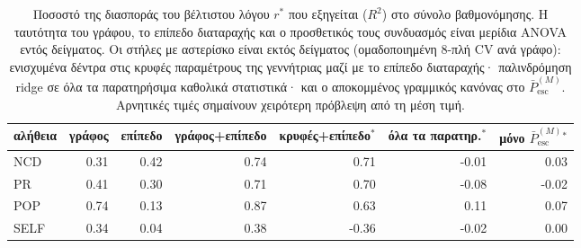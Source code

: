\begin{table}[t]
\centering
\footnotesize
\caption{Ποσοστό της διασποράς του βέλτιστου λόγου $r^*$ που εξηγείται ($R^2$) στο σύνολο βαθμονόμησης. Η ταυτότητα του γράφου, το επίπεδο διαταραχής και ο προσθετικός τους συνδυασμός είναι μερίδια ANOVA εντός δείγματος. Οι στήλες με αστερίσκο είναι εκτός δείγματος (ομαδοποιημένη 8-πλή CV ανά γράφο): ενισχυμένα δέντρα στις κρυφές παραμέτρους της γεννήτριας μαζί με το επίπεδο διαταραχής· παλινδρόμηση ridge σε όλα τα παρατηρήσιμα καθολικά στατιστικά· και ο αποκομμένος γραμμικός κανόνας στο $\bar P^{(M)}_{\mathrm{esc}}$. Αρνητικές τιμές σημαίνουν χειρότερη πρόβλεψη από τη μέση τιμή.}
\label{tab:stage1dec}
\begin{tabular}{@{}lrrrrrr@{}}
\toprule
αλήθεια & γράφος & επίπεδο & γράφος+επίπεδο & κρυφές+επίπεδο$^{*}$ & όλα τα παρατηρ.$^{*}$ & μόνο $\bar P^{(M)}_{\mathrm{esc}}$$^{*}$ \\
\midrule
NCD & 0.31 & 0.42 & 0.74 & 0.71 & -0.01 & 0.03 \\
PR & 0.41 & 0.30 & 0.71 & 0.70 & -0.08 & -0.02 \\
POP & 0.74 & 0.13 & 0.87 & 0.63 & 0.11 & 0.07 \\
SELF & 0.34 & 0.04 & 0.38 & -0.36 & -0.02 & 0.00 \\
\bottomrule
\end{tabular}
\end{table}
